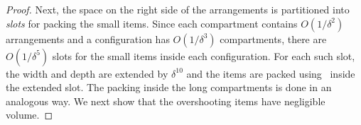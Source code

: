 \begin{proof}
				
				
		

Next, the space on the right side of the arrangements is partitioned into \emph{slots} for packing the small items. Since each compartment contains $O(1/\delta^2)$ arrangements and a configuration has $O(1/\delta^3)$ compartments, there are $O(1/\delta^5)$ slots for the small items inside each configuration. For each such slot, the width and depth are extended by $\delta^{10}$ and the items are packed using \tNFDH~inside the extended slot. The packing inside the long compartments is done in an analogous way. We next show that the overshooting items have negligible volume.


\end{proof}
